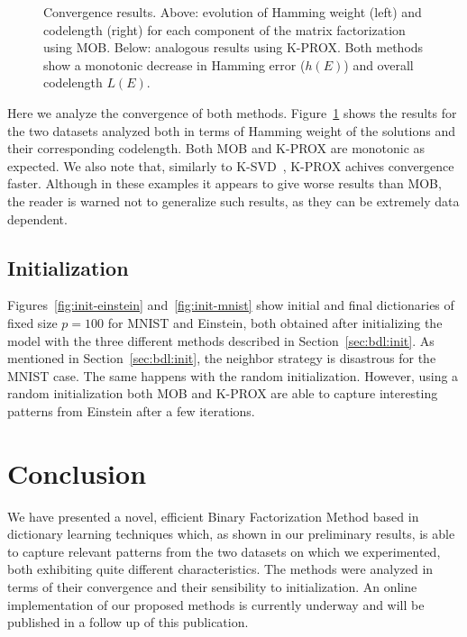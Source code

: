\documentclass[twocolumn]{IEEEtran}
\theoremstyle{definition}
\begin{document}
\begin{figure}[tp]
\caption{\label{fig:convergence} Convergence results. Above: evolution of Hamming weight (left) and codelength (right) for each component of the matrix factorization using MOB. Below: analogous results using K-PROX. Both methods show a monotonic decrease in Hamming error ($h(E)$) and overall codelength $L(E)$.}
\end{figure}
Here we analyze the convergence of both methods. Figure~\ref{fig:convergence} shows the results for the two datasets analyzed both in terms of Hamming weight of the solutions and their corresponding codelength. Both MOB and K-PROX are monotonic as expected. We also note that, similarly to K-SVD~\cite{ksvd}, K-PROX achives convergence faster.  Although in these examples it appears to give worse results than MOB, the reader is warned not to generalize such results, as they can be extremely data dependent.

\subsection{Initialization}

Figures~\ref{fig:init-einstein} and~\ref{fig:init-mnist} show initial and final dictionaries of fixed size $p=100$ for MNIST and Einstein, both obtained after initializing the model with the three different methods described in Section~\ref{sec:bdl:init}. As mentioned in Section~\ref{sec:bdl:init}, the neighbor strategy is disastrous for the MNIST case. The same happens with the random initialization.  However, using a random initialization both MOB and K-PROX are able to capture interesting patterns from Einstein after a few iterations. 

\section{Conclusion}
\label{sec:conclusion}

We have presented a novel, efficient Binary Factorization Method based in dictionary learning techniques which, as shown in our preliminary results, is able to capture relevant patterns from the two datasets on which we experimented, both exhibiting quite different characteristics. The methods were analyzed in terms of their convergence and their sensibility to initialization. An online implementation of our proposed methods is currently underway and will be published in a follow up of this publication.



\end{document}
